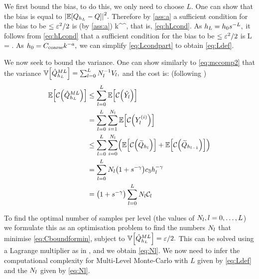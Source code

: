 We first bound the bias, to do this, we only need to choose $L.$ One can show that the bias is equal to $\abs{\EXP{\QhL - Q}}^2.$ Therefore by \cref{ass:a} a sufficient condition for the bias to be $\leq \varepsilon^2/2$ is (by \cref{ass:a})
\beqs
\co k^\sigma \hL^\alpha \leq {},
\eeqs
that is, \eqref{eq:hLcond}. As $h_{L} = h_{0} s^{-L},$ it follows from \eqref{eq:hLcond} that a sufficient condition for the bias to be $\leq \varepsilon^2/2$ is
\beq\label{eq:Lcondpart}
L = .
\eeq
As $h_{0} = C_{\mathrm{coarse}} k^{-a},$ we can simplify \eqref{eq:Lcondpart} to obtain \eqref{eq:Ldef}.

We now seek to bound the variance. One can show similarly to \cref{eq:mccomp2} that the variance $\VAR{\QhatMLhL} = \sum_{l=0}^L \Nl^{-1} \Vl,$ and the cost is: (following \cite{GrPaSc:19})
\begin{align}
\EXP{\Cost{\QhatMLhL}}&\leq \sum_{l=0}^L \EXP{\Cost{\Ylhat}}\nonumber\\
&= \sum_{l=0}^L \sum_{i=1}^{\Nl} \EXP{\Cost{\Yli}}\nonumber\\
&\leq \sum_{l=0}^L \sum_{i=0}^{\Nl} \mleft(\EXP{\Cost{\Qhltilde}} + \EXP{\Cost{\Qhlmotilde}}\mright)\nonumber\\
&=\sum_{l=0}^L \Nl\mleft(1+s^{-\gamma}\mright) \cth \hl^{-\gamma}\nonumber\\
&= \mleft(1+s^{-\gamma}\mright) \sum_{l=0}^L \Nl\Cl\label{eq:Cboundformin}
\end{align}

To find the optimal number of samples per level (the values of $N_{l}, l=0,\ldots,L$) we formulate this as an optimisation problem to find the numbers $N_{l}$ that minimise \eqref{eq:Cboundformin}, subject to $\VAR{\QhatMLhL}=\eps/2.$ This can be solved using a Lagrange multiplier as in \cite{Gi:15}, and we obtain \cref{eq:Nl}. We now need to infer the computational complexity for Multi-Level Monte-Carlo with $L$ given by \eqref{eq:Ldef} and the $N_{l}$ given by \eqref{eq:Nl}.

